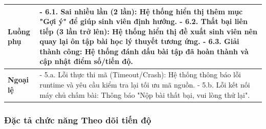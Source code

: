 \documentclass[../main.tex]{subfiles}
\begin{document}
{\begin{tabularx}{\textwidth}{|p{3.5cm}|X|}
\hline
\textbf{Luồng phụ} & - 6.1. Sai nhiều lần (2 lần): Hệ thống hiển thị thêm mục "Gợi ý" để giúp sinh viên định hướng. \newline - 6.2. Thất bại liên tiếp (3 lần trở lên): Hệ thống hiển thị đề xuất sinh viên nên quay lại ôn tập bài học lý thuyết tương ứng. \newline - 6.3. Giải thành công: Hệ thống đánh dấu bài tập đã hoàn thành và cập nhật điểm số/tiến độ. \\
\hline
\textbf{Ngoại lệ} & - 5.a. Lỗi thực thi mã (Timeout/Crash): Hệ thống thông báo lỗi runtime và yêu cầu kiểm tra lại tối ưu mã nguồn. \newline - 5.b. Lỗi kết nối máy chủ chấm bài: Thông báo "Nộp bài thất bại, vui lòng thử lại". \\
\hline
\end{tabularx}
}

\subsubsection{Đặc tả chức năng Theo dõi tiến độ}
\end{document}
